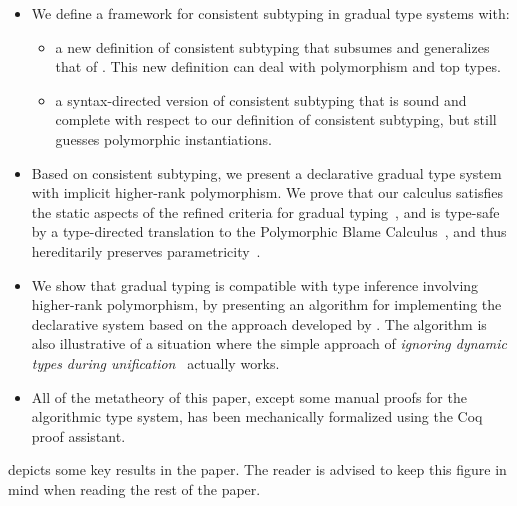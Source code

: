\begin{itemize}
\item We define a framework for consistent subtyping in gradual type systems
  with:
  \begin{itemize}
  \item a new definition of consistent subtyping that subsumes and generalizes that
    of \citet{siek2007gradual}. This new definition can deal with
    polymorphism and top types.
  \item a syntax-directed version of consistent subtyping that is
    sound and complete with respect to our definition of consistent
    subtyping, but still guesses polymorphic instantiations.
  \end{itemize}
\item Based on consistent subtyping, we present a declarative gradual type
  system with implicit higher-rank polymorphism. We prove that our calculus
  satisfies the static aspects of the refined criteria for gradual
  typing~\cite{siek2015refined}, and is type-safe by a type-directed
  translation to the Polymorphic Blame Calculus~\cite{ahmed2011blame}, and thus
  hereditarily preserves parametricity~\cite{amal2017blame}.
\item We show that gradual typing is compatible with type inference involving
  higher-rank polymorphism, by presenting an algorithm for implementing the
  declarative system based on the approach developed by
  \citet{dunfield2013complete}. The algorithm is also illustrative of a
  situation where the simple approach of \textit{ignoring dynamic types during
    unification}~\cite{siek2008gradual} actually works.
\item All of the metatheory of this paper, except some manual proofs for the
  algorithmic type system, has been mechanically formalized using the Coq proof
  assistant.
\end{itemize}

 depicts some key results in the paper. The reader is
advised to keep this figure in mind when reading the rest of the paper.

